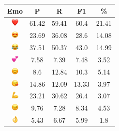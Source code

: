 \documentclass{article}
\begin{document}
\begin{table}
\centering
\begin{tabular}{|c|ccc|c|} \hline
\textbf{Emo} & \textbf{P} & \textbf{R} & \textbf{F1} & \textbf{\%} \\ \hline
\includegraphics[height=0.37cm,width=0.37cm]{img/red_heart.png} & 61.42 & 59.41 & 60.4 & 21.41\\ 
\includegraphics[height=0.37cm,width=0.37cm]{img/smiling_face_with_hearteyes.png} & 23.69 & 36.08 & 28.6 & 14.08\\ 
\includegraphics[height=0.37cm,width=0.37cm]{img/face_with_tears_of_joy.png} & 37.51 & 50.37 & 43.0 & 14.99\\ 
\includegraphics[height=0.37cm,width=0.37cm]{img/two_hearts.png} & 7.58 & 7.39 & 7.48 & 3.52\\ 
\includegraphics[height=0.37cm,width=0.37cm]{img/smiling_face_with_smiling_eyes.png} & 8.6 & 12.84 & 10.3 & 5.14\\ 
\includegraphics[height=0.37cm,width=0.37cm]{img/face_blowing_a_kiss.png} & 14.86 & 12.09 & 13.33 & 3.97\\ 
\includegraphics[height=0.37cm,width=0.37cm]{img/flexed_biceps.png} & 23.21 & 30.62 & 26.4 & 3.07\\ 
\includegraphics[height=0.37cm,width=0.37cm]{img/winking_face.png} & 9.76 & 7.28 & 8.34 & 4.53\\ 
\includegraphics[height=0.37cm,width=0.37cm]{img/OK_hand.png} & 5.43 & 6.67 & 5.99 & 1.8\\ 

\end{tabular}
\end{table}
\end{document}
